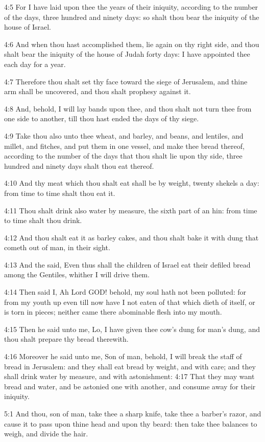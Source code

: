 4:5 For I have laid upon thee the years of their iniquity, according to the number of the days, three hundred and ninety days: so shalt thou bear the iniquity of the house of Israel.

4:6 And when thou hast accomplished them, lie again on thy right side, and thou shalt bear the iniquity of the house of Judah forty days: I have appointed thee each day for a year.

4:7 Therefore thou shalt set thy face toward the siege of Jerusalem, and thine arm shall be uncovered, and thou shalt prophesy against it.

4:8 And, behold, I will lay bands upon thee, and thou shalt not turn thee from one side to another, till thou hast ended the days of thy siege.

4:9 Take thou also unto thee wheat, and barley, and beans, and lentiles, and millet, and fitches, and put them in one vessel, and make thee bread thereof, according to the number of the days that thou shalt lie upon thy side, three hundred and ninety days shalt thou eat thereof.

4:10 And thy meat which thou shalt eat shall be by weight, twenty shekels a day: from time to time shalt thou eat it.

4:11 Thou shalt drink also water by measure, the sixth part of an hin: from time to time shalt thou drink.

4:12 And thou shalt eat it as barley cakes, and thou shalt bake it with dung that cometh out of man, in their sight.

4:13 And the \LORD said, Even thus shall the children of Israel eat their defiled bread among the Gentiles, whither I will drive them.

4:14 Then said I, Ah Lord GOD! behold, my soul hath not been polluted: for from my youth up even till now have I not eaten of that which dieth of itself, or is torn in pieces; neither came there abominable flesh into my mouth.

4:15 Then he said unto me, Lo, I have given thee cow's dung for man's dung, and thou shalt prepare thy bread therewith.

4:16 Moreover he said unto me, Son of man, behold, I will break the staff of bread in Jerusalem: and they shall eat bread by weight, and with care; and they shall drink water by measure, and with astonishment: 4:17 That they may want bread and water, and be astonied one with another, and consume away for their iniquity.

5:1 And thou, son of man, take thee a sharp knife, take thee a barber's razor, and cause it to pass upon thine head and upon thy beard: then take thee balances to weigh, and divide the hair.

